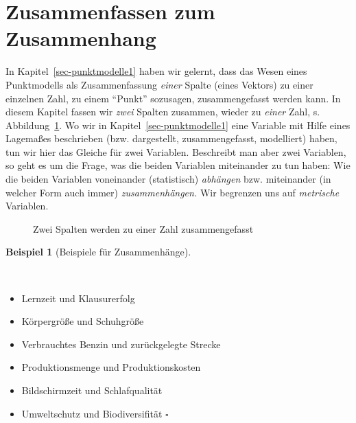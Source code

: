 \documentclass[
  letterpaper,
  oneside,
  open=any]{scrbook}
\providecommand{\tightlist}{%
  \setlength{\itemsep}{0pt}\setlength{\parskip}{0pt}}\usepackage{longtable,booktabs,array}
\theoremstyle{definition}
\theoremstyle{definition}
\newtheorem{example}{Beispiel}[chapter]
\theoremstyle{definition}
\theoremstyle{remark}
\begin{document}
\section{Zusammenfassen zum
Zusammenhang}\label{zusammenfassen-zum-zusammenhang}

In Kapitel~\ref{sec-punktmodelle1} haben wir gelernt, dass das Wesen
eines Punktmodells als Zusammenfassung \emph{einer} Spalte (eines
Vektors) zu einer einzelnen Zahl, zu einem \enquote{Punkt} sozusagen,
zusammengefasst werden kann. In diesem Kapitel fassen wir \emph{zwei}
Spalten zusammen, wieder zu \emph{einer} Zahl, s.
Abbildung~\ref{fig-desk2}. Wo wir in Kapitel~\ref{sec-punktmodelle1}
eine Variable mit Hilfe eines Lagemaßes beschrieben (bzw. dargestellt,
zusammengefasst, modelliert) haben, tun wir hier das Gleiche für zwei
Variablen. Beschreibt man aber zwei Variablen, so geht es um die Frage,
was die beiden Variablen miteinander zu tun haben: Wie die beiden
Variablen voneinander (statistisch) \emph{abhängen} bzw. miteinander (in
welcher Form auch immer) \emph{zusammenhängen.} Wir begrenzen uns auf
\emph{metrische} Variablen.

\begin{figure}


\caption{\label{fig-desk2}Zwei Spalten werden zu einer Zahl
zusammengefasst}

\end{figure}%

\begin{example}[Beispiele für
Zusammenhänge]\protect\hypertarget{exm-zsmn}{}\label{exm-zsmn}

~

\begin{itemize}
\tightlist
\item
  Lernzeit und Klausurerfolg
\item
  Körpergröße und Schuhgröße
\item
  Verbrauchtes Benzin und zurückgelegte Strecke
\item
  Produktionsmenge und Produktionskosten
\item
  Bildschirmzeit und Schlafqualität
\item
  Umweltschutz und Biodiversifität \(\square\)
\end{itemize}

\end{example}
\end{document}
